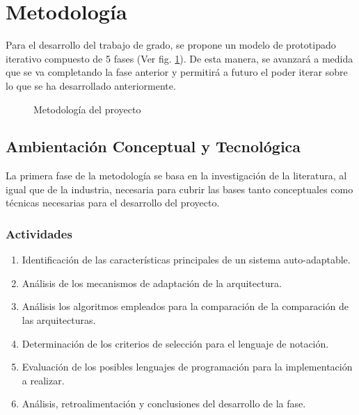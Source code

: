 \documentclass[12pt]{article}
\begin{document}



\pagebreak

\section{Metodología}

Para el desarrollo del trabajo de grado, se propone un modelo de prototipado iterativo compuesto de 5 fases (Ver fig. \ref{fig:met}). De esta manera, se avanzará a medida que se va completando la fase anterior y permitirá a futuro el poder iterar sobre lo que se ha desarrollado anteriormente.

\begin{figure}[H]
	\centering
	
	\caption{Metodología del proyecto}
	\label{fig:met}
\end{figure}

\subsection{Ambientación Conceptual y Tecnológica}

La primera fase de la metodología se basa en la investigación de la literatura, al igual que de la industria, necesaria para cubrir las bases tanto conceptuales como técnicas necesarias para el desarrollo del proyecto.

\subsubsection*{Actividades}

\begin{enumerate}[label=\thesubsection.\arabic*., wide, labelindent=2em, leftmargin=5em]
	\item Identificación de las características principales de un sistema auto-adaptable.
	\item Análisis de los mecanismos de adaptación de la arquitectura.
	\item Análisis los algoritmos empleados para la comparación de la comparación de las arquitecturas.
	\item Determinación de los criterios de selección para el lenguaje de notación.
	\item Evaluación de los posibles lenguajes de programación para la implementación a realizar.
	\item Análisis, retroalimentación y conclusiones del desarrollo de la fase.
\end{enumerate}
\end{document}
